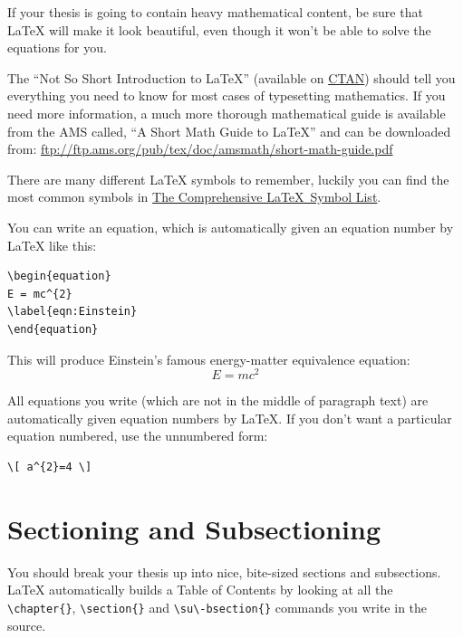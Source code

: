 If your thesis is going to contain heavy mathematical content, be sure that \LaTeX{} will make it look beautiful, even though it won't be able to solve the equations for you.

The \enquote{Not So Short Introduction to \LaTeX} (available on \href{http://www.ctan.org/tex-archive/info/lshort/english/lshort.pdf}{CTAN}) should tell you everything you need to know for most cases of typesetting mathematics. If you need more information, a much more thorough mathematical guide is available from the AMS called, \enquote{A Short Math Guide to \LaTeX} and can be downloaded from:
\url{ftp://ftp.ams.org/pub/tex/doc/amsmath/short-math-guide.pdf}

There are many different \LaTeX{} symbols to remember, luckily you can find the most common symbols in \href{http://ctan.org/pkg/comprehensive}{The Comprehensive \LaTeX~Symbol List}.

You can write an equation, which is automatically given an equation number by \LaTeX{} like this:
\begin{verbatim}
\begin{equation}
E = mc^{2}
\label{eqn:Einstein}
\end{equation}
\end{verbatim}

This will produce Einstein's famous energy-matter equivalence equation:
\begin{equation}
E = mc^{2}
\label{eqn:Einstein}
\end{equation}

All equations you write (which are not in the middle of paragraph text) are automatically given equation numbers by \LaTeX{}. If you don't want a particular equation numbered, use the unnumbered form:
\begin{verbatim}
\[ a^{2}=4 \]
\end{verbatim}


\section{Sectioning and Subsectioning}

You should break your thesis up into nice, bite-sized sections and sub\-sections.
\LaTeX{} auto\-ma\-tically builds a Table of Contents by looking at all the
\verb|\chapter{}|, \verb|\section{}|  and \verb|\su\-bsection{}| commands you
write in the source.

